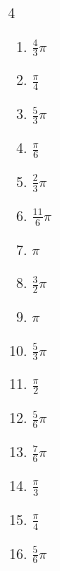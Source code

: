 \begin{multicols}{4}
\begin{enumerate}
  \item $\displaystyle \frac{4}{3}\pi$

  \item $\displaystyle \frac{\pi}{4}$

  \item $\displaystyle \frac{5}{3}\pi$

  \item $\displaystyle \frac{\pi}{6}$

  \item $\displaystyle \frac{2}{3}\pi$

  \item $\displaystyle \frac{11}{6}\pi$

  \item $\displaystyle \pi$

  \item $\displaystyle \frac{3}{2}\pi$

  \item $\displaystyle \pi$

  \item $\displaystyle \frac{5}{3}\pi$

  \item $\displaystyle \frac{\pi}{2}$

  \item $\displaystyle \frac{5}{6}\pi$

  \item $\displaystyle \frac{7}{6}\pi$

  \item $\displaystyle \frac{\pi}{3}$

  \item $\displaystyle \frac{\pi}{4}$

  \item $\displaystyle \frac{5}{6}\pi$


\end{enumerate}
\end{multicols}
